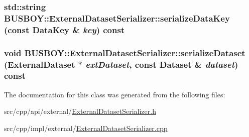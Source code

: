 \label{classBUSBOY_1_1ExternalDatasetSerializer_a7f11a3e1bdb20867ffa58d64c6757c1d}
\hypertarget{classBUSBOY_1_1ExternalDatasetSerializer_a7507c700084f55f9146e3987925feb1c}{
\subsubsection[{serializeDataKey}]{\setlength{\rightskip}{0pt plus 5cm}std::string BUSBOY::ExternalDatasetSerializer::serializeDataKey (const {\bf DataKey} \& {\em key}) const}}
\label{classBUSBOY_1_1ExternalDatasetSerializer_a7507c700084f55f9146e3987925feb1c}
\hypertarget{classBUSBOY_1_1ExternalDatasetSerializer_a2da3f16e76e2eb95aa22113502938620}{
\subsubsection[{serializeDataset}]{\setlength{\rightskip}{0pt plus 5cm}void BUSBOY::ExternalDatasetSerializer::serializeDataset ({\bf ExternalDataset} $\ast$ {\em extDataset}, \/  const {\bf Dataset} \& {\em dataset}) const}}
\label{classBUSBOY_1_1ExternalDatasetSerializer_a2da3f16e76e2eb95aa22113502938620}


The documentation for this class was generated from the following files:\begin{DoxyCompactItemize}
\item 
src/cpp/api/external/\hyperlink{ExternalDatasetSerializer_8h}{ExternalDatasetSerializer.h}\item 
src/cpp/impl/external/\hyperlink{ExternalDatasetSerializer_8cpp}{ExternalDatasetSerializer.cpp}\end{DoxyCompactItemize}
